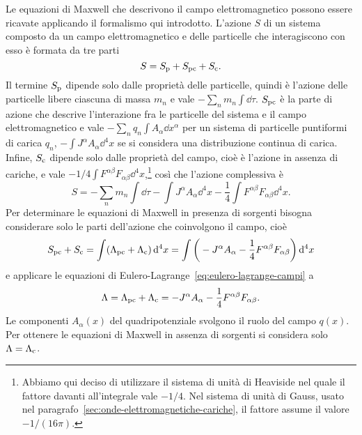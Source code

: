 Le equazioni di Maxwell che descrivono il campo
elettromagnetico possono essere ricavate applicando il formalismo qui
introdotto.  L'azione $S$ di un sistema
composto da un campo elettromagnetico e delle particelle che interagiscono con
esso è formata da tre parti
\begin{equation}
  S = S_{\textup{p}} + S_{\textup{pc}} + S_{\textup{c}}.
\end{equation}
Il termine $S_{\textup{p}}$ dipende solo dalle proprietà delle particelle,
quindi è l'azione delle particelle libere ciascuna di massa $m_{n}$ e vale
$-\sum_{n} m_{n}\int\dd \tau$.  $S_{\textup{pc}}$ è la parte di azione che
descrive l'interazione fra le particelle del sistema e il campo elettromagnetico
e vale $-\sum_{n} q_{n}\int A_{\alpha}\dd x^{\alpha}$ per un sistema di
particelle puntiformi di carica $q_{n}$, $-\int J^{\alpha}A_{\alpha}\dd^{4} x$
se si considera una distribuzione continua di carica.  Infine, $S_{\textup{c}}$
dipende solo dalle proprietà del campo, cioè è l'azione in assenza di cariche, e
vale $-1/4 \int F^{\alpha\beta}F_{\alpha\beta}\dd^{4}
x$,\footnote{Abbiamo
  qui deciso di utilizzare il sistema di unità di Heaviside nel quale il fattore
  davanti all'integrale vale $-1/4$.  Nel sistema di unità di Gauss, usato nel
  paragrafo~\ref{sec:onde-elettromagnetiche-cariche}, il fattore assume il
  valore $-1/(16\pi)$.}  così che l'azione complessiva è
\begin{equation}
  S = -\sum_{n} m_{n}\int \dd\tau - \int J^{\alpha}A_{\alpha} \dd^{4} x
  -\frac{1}{4} \int F^{\alpha\beta}F_{\alpha\beta} \dd^{4} x.
\end{equation}
Per determinare le equazioni di Maxwell in presenza
di sorgenti bisogna considerare solo le parti dell'azione che coinvolgono il
campo, cioè
\begin{equation}
  S_{\textup{pc}} + S_{\textup{c}} =  \int (\Lambda_{\textup{pc}} +
  \Lambda_{\textup{c}}) \mathop{}\!\mathrm{d}^{4} x = \int \bigg( -J^{\alpha}A_{\alpha}
  -\frac{1}{4} F^{\alpha\beta}F_{\alpha\beta} \bigg) \mathop{}\!\mathrm{d}^{4} x
\end{equation}
e applicare le equazioni di Eulero-Lagrange~\eqref{eq:eulero-lagrange-campi} a
\begin{equation}
  \Lambda = \Lambda_{\textup{pc}} + \Lambda_{\textup{c}} = -J^{\alpha}A_{\alpha}
  -\frac{1}{4} F^{\alpha\beta}F_{\alpha\beta}.
\end{equation}
Le componenti $A_{\alpha}(x)$ del quadripotenziale svolgono il ruolo del campo
$q(x)$.  Per ottenere le equazioni di Maxwell in
assenza di sorgenti si considera solo $\Lambda = \Lambda_{\textup{c}}$.


